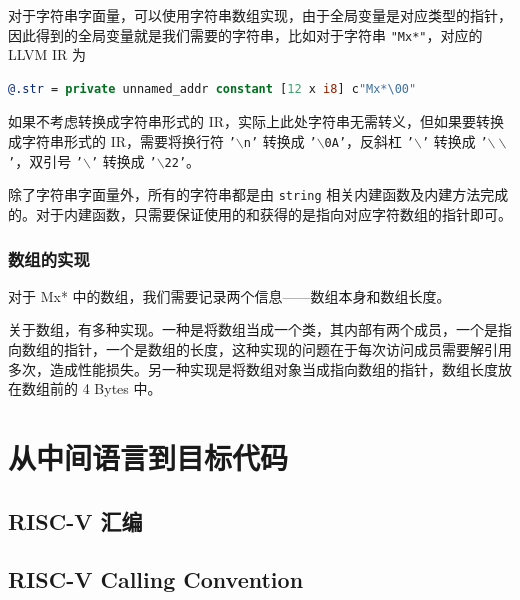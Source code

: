 对于字符串字面量，可以使用字符串数组实现，由于全局变量是对应类型的指针，因此得到的全局变量就是我们需要的字符串，比如对于字符串
\texttt{"Mx*"}，对应的 LLVM IR 为
\begin{lstlisting}[language=llvm]
@.str = private unnamed_addr constant [12 x i8] c"Mx*\00"
\end{lstlisting}

如果不考虑转换成字符串形式的 IR，实际上此处字符串无需转义，但如果要转换成字符串形式的
IR，需要将换行符 \texttt{'$\backslash$n'} 转换成 \texttt{'$\backslash$0A'}，反斜杠
\texttt{'$\backslash$'} 转换成 \texttt{'$\backslash\backslash$'}，双引号
\texttt{'$\backslash$'} 转换成 \texttt{'$\backslash$22'}。

除了字符串字面量外，所有的字符串都是由 \texttt{string}
相关内建函数及内建方法完成的。对于内建函数，只需要保证使用的和获得的是指向对应字符数组的指针即可。

\subsubsection{数组的实现}\label{AST-to-IR-for-builtin-array}

对于 Mx* 中的数组，我们需要记录两个信息——数组本身和数组长度。

关于数组，有多种实现。一种是将数组当成一个类，其内部有两个成员，一个是指向数组的指针，一个是数组的长度，这种实现的问题在于每次访问成员需要解引用多次，造成性能损失。另一种实现是将数组对象当成指向数组的指针，数组长度放在数组前的
4 Bytes 中。

\section{从中间语言到目标代码}

\subsection{RISC-V 汇编}

\subsection{RISC-V Calling Convention}
